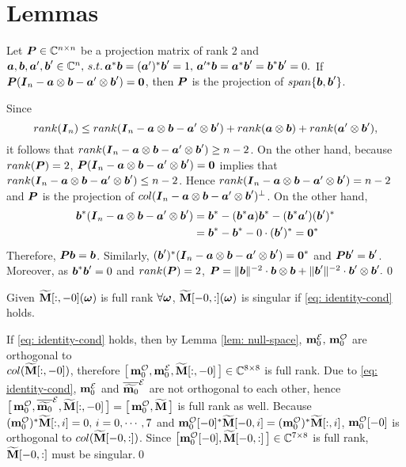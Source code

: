 \section{Lemmas}\label{app: lemmas}

\begin{lemma}\label{lem: null-space}
Let $\V{P}\in\mathbb{C}^{n\times n}$ be a projection matrix of rank $2$ and $\V{a},\V{b},\V{a}',\V{b}'\in\mathbb{C}^n,\, s.t.\, \V{a}^*\V{b} = (\V{a}')^*\V{b}'=1,\, \V{a}'^*\V{b} = \V{a}^*\V{b}' = \V{b}^*\V{b}' = 0.$ If $\V{P}(\V{I}_n - \V{a}\otimes\V{b} - \V{a}'\otimes\V{b}' ) = \V{0}$, then $\V{P}$ is the projection of $span\{\V{b},\V{b}'\}$.
\end{lemma}
Since $$rank(\V{I}_n) \leq rank(\V{I}_n-\V{a}\otimes\V{b}-\V{a}'\otimes\V{b}') + rank(\V{a}\otimes\V{b}) + rank(\V{a}'\otimes\V{b}'),$$
it follows that $rank(\V{I}_n-\V{a}\otimes\V{b}-\V{a}'\otimes\V{b}')\geq n - 2$. On the other hand, because $rank(\V{P}) = 2$, $\V{P}(\V{I}_n - \V{a}\otimes\V{b} - \V{a}'\otimes\V{b}' ) = \V{0}$ implies that $rank(\V{I}_n-\V{a}\otimes\V{b}-\V{a}'\otimes\V{b}')\leq n - 2$. Hence $rank(\V{I}_n-\V{a}\otimes\V{b}-\V{a}'\otimes\V{b}') = n - 2$ and $\V{P}$ is the projection of $col(\V{I}_n-\V{a}\otimes\V{b}-\V{a}'\otimes\V{b}')^\bot$. On the other hand,
\begin{align*}
\V{b}^*(\V{I}_n-\V{a}\otimes\V{b}-\V{a}'\otimes\V{b}')
&= \V{b}^* - (\V{b}^*\V{a})\V{b}^* - (\V{b}^*\V{a}')(\V{b}')^*\\
&= \V{b}^* - \V{b}^* - 0\cdot (\V{b}')^* = \V{0}^*
\end{align*}
Therefore, $\V{P}\V{b} = \V{b}$.
Similarly, $(\V{b}')^* (\V{I}_n-\V{a}\otimes\V{b}-\V{a}'\otimes\V{b}')=\V{0}^*$ and $\V{P}\V{b}' = \V{b}'$. Moreover, as $\V{b}^*\V{b}' = 0$ and $rank(\V{P}) = 2$, $\V{P} = \Vert\V{b}\Vert^{-2}\cdot\V{b}\otimes\V{b} + \Vert\V{b}'\Vert^{-2}\cdot\V{b}'\otimes\V{b}'.$\qed

\begin{lemma}
Given $\M[:,-0](\V{\omega})$ is full rank $\forall \V{\omega}$, $\M[-0,:](\V{\omega})$ is singular if \eqref{eq: identity-cond} holds.
\end{lemma}
If \eqref{eq: identity-cond} holds, then by Lemma \ref{lem: null-space}, $\meven,\,\modd$ are orthogonal to \\$col(\M[:,-0])$, therefore $\big[\,\modd,\meven,\M[:,-0]\,\big]\in\mathbb{C}^{8\times 8}$ is full rank. Due to \eqref{eq: identity-cond}, $\meven$ and $\mteven$ are not orthogonal to each other, hence $\big[\,\modd,\mteven,\M[:,-0]\,\big] = \big[\,\modd, \M\,\big]$ is full rank as well. Because $(\modd)^*\M[:, i] = 0,\,i= 0,\cdots,7$ and $\modd[-0]^*\M[-0, i] = (\modd)^*\M[:,i]$, $\modd[-0]$ is orthogonal to $col(\M[-0,:])$. Since $\big[ \modd[-0], \M[-0,:]\,\big]\in\mathbb{C}^{7\times 8}$ is full rank, $\M[-0,:]$ must be singular.\qed
